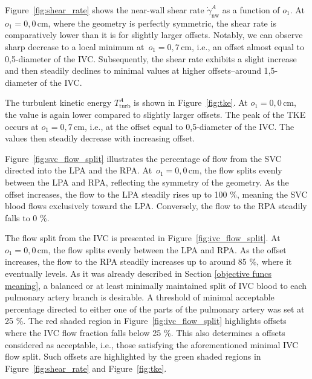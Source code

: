 Figure~\ref{fig:shear_rate} shows the near-wall shear rate $\dot{\gamma}^{A}_{\mathrm{nw}}$ as a function of $o_1$. At~$o_1 = 0{,}0 \, \mathrm{cm}$, where the geometry is perfectly symmetric, the shear rate is comparatively lower than it is for slightly larger offsets. Notably, we can observe sharp decrease to a local minimum at~$o_1 = 0{,}7 \, \mathrm{cm}$, i.e., an offset almost equal to 0{,}5-diameter of the IVC.  Subsequently, the shear rate exhibits a slight increase and then steadily declines to minimal values at higher offsets--around 1{,}5-diameter of the IVC.

The turbulent kinetic energy $T^{A}_{\mathrm{turb}}$ is shown in Figure~\ref{fig:tke}. At $o_1 = 0{,}0 \, \mathrm{cm}$, the value is again lower compared to slightly larger offsets. The peak of the TKE occurs at $o_1 = 0{,}7 \, \mathrm{cm}$, i.e., at the offset equal to 0{,}5-diameter of the IVC. The values then steadily decrease with increasing offset.

Figure~\ref{fig:svc_flow_split} illustrates the percentage of flow from the SVC directed into the LPA and the RPA. At~$o_1 = 0{,}0 \, \mathrm{cm}$, the flow splits evenly between the LPA and RPA, reflecting the symmetry of the geometry. As the offset increases, the flow to the LPA steadily rises up to 100 \%, meaning the SVC blood flows exclusively toward the LPA. Conversely, the flow to the RPA steadily falls to 0 \%. 

The flow split from the IVC is presented in Figure~\ref{fig:ivc_flow_split}. At $o_1 = 0{,}0 \, \mathrm{cm}$, the flow splits evenly between the LPA and RPA. As the offset increases, the flow to the RPA steadily increases up to around 85 \%, where it eventually levels. As it was already described in Section \ref{objective funcs meaning}, a balanced or at least minimally maintained split of IVC blood to each pulmonary artery branch is desirable. A threshold of minimal acceptable percentage directed to either one of the parts of the pulmonary artery was set at 25 \%. The red shaded region in Figure~\ref{fig:ivc_flow_split} highlights offsets where the IVC flow fraction falls below 25 \%. This also determines a offsets considered as acceptable, i.e., those satisfying the aforementioned minimal IVC flow split. Such offsets are highlighted by the green shaded regions in Figure~\ref{fig:shear_rate} and Figure~\ref{fig:tke}.

